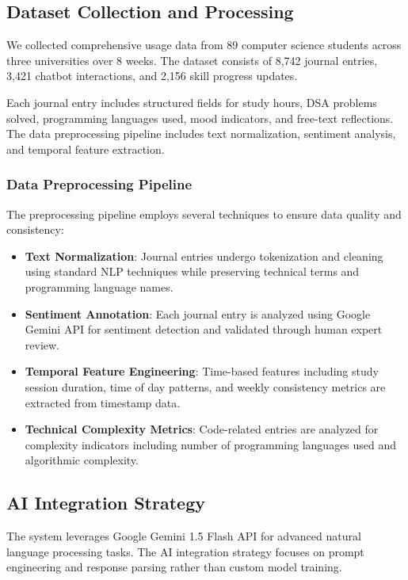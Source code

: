 \documentclass[conference,10pt]{IEEEtran}
\begin{document}
\subsection{Dataset Collection and Processing}

We collected comprehensive usage data from 89 computer science students across three universities over 8 weeks. The dataset consists of 8,742 journal entries, 3,421 chatbot interactions, and 2,156 skill progress updates.

Each journal entry includes structured fields for study hours, DSA problems solved, programming languages used, mood indicators, and free-text reflections. The data preprocessing pipeline includes text normalization, sentiment analysis, and temporal feature extraction.

\subsubsection{Data Preprocessing Pipeline}

The preprocessing pipeline employs several techniques to ensure data quality and consistency:

\begin{itemize}
\item \textbf{Text Normalization}: Journal entries undergo tokenization and cleaning using standard NLP techniques while preserving technical terms and programming language names.

\item \textbf{Sentiment Annotation}: Each journal entry is analyzed using Google Gemini API for sentiment detection and validated through human expert review.

\item \textbf{Temporal Feature Engineering}: Time-based features including study session duration, time of day patterns, and weekly consistency metrics are extracted from timestamp data.

\item \textbf{Technical Complexity Metrics}: Code-related entries are analyzed for complexity indicators including number of programming languages used and algorithmic complexity.
\end{itemize}

\subsection{AI Integration Strategy}

The system leverages Google Gemini 1.5 Flash API for advanced natural language processing tasks. The AI integration strategy focuses on prompt engineering and response parsing rather than custom model training.
\end{document}
